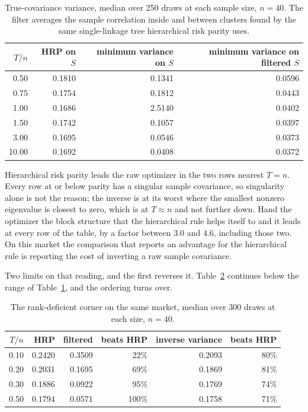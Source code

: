 \documentclass[11pt]{article}
\theoremstyle{remark}
\begin{document}
\begin{table}[ht]
\centering
\begin{tabular}{rrrr}
\toprule
$T/n$ & HRP on $S$ & minimum variance on $S$ & minimum variance on filtered $S$ \\
\midrule
0.50 & 0.1810 & 0.1341 & 0.0596 \\
0.75 & 0.1754 & 0.1812 & 0.0443 \\
1.00 & 0.1686 & 2.5140 & 0.0402 \\
1.50 & 0.1742 & 0.1057 & 0.0397 \\
3.00 & 0.1695 & 0.0546 & 0.0373 \\
10.00 & 0.1692 & 0.0408 & 0.0372 \\
\bottomrule
\end{tabular}
\caption{True-covariance variance, median over 250 draws at each sample
size, $n = 40$. The filter averages the sample correlation inside and
between clusters found by the same single-linkage tree hierarchical risk
parity uses.}
\label{tab:controlled}
\end{table}

Hierarchical risk parity leads the raw optimizer in the two rows nearest
$T = n$. Every row at or below parity has a singular sample covariance, so
singularity alone is not the reason; the inverse is at its worst where the
smallest nonzero eigenvalue is closest to zero, which is at $T \approx n$ and
not further down. Hand the optimizer the block structure that the
hierarchical rule helps itself to and it leads at every row of the table, by a
factor between $3.0$ and $4.6$, including those two. On this market
the comparison that reports an advantage for the hierarchical rule is
reporting the cost of inverting a raw sample covariance.

Two limits on that reading, and the first reverses it.
Table~\ref{tab:deep} continues below the range of
Table~\ref{tab:controlled}, and the ordering turns over.

\begin{table}[ht]
\centering
\begin{tabular}{rrrrrr}
\toprule
$T/n$ & HRP & filtered & beats HRP & inverse variance & beats HRP \\
\midrule
0.10 & 0.2420 & 0.3509 & 22\% & 0.2093 & 80\% \\
0.20 & 0.2031 & 0.1695 & 69\% & 0.1869 & 81\% \\
0.30 & 0.1886 & 0.0922 & 95\% & 0.1769 & 74\% \\
0.50 & 0.1794 & 0.0571 & 100\% & 0.1758 & 71\% \\
\bottomrule
\end{tabular}
\caption{The rank-deficient corner on the same market, median over 300 draws
at each size, $n = 40$.}
\label{tab:deep}
\end{table}
\end{document}
